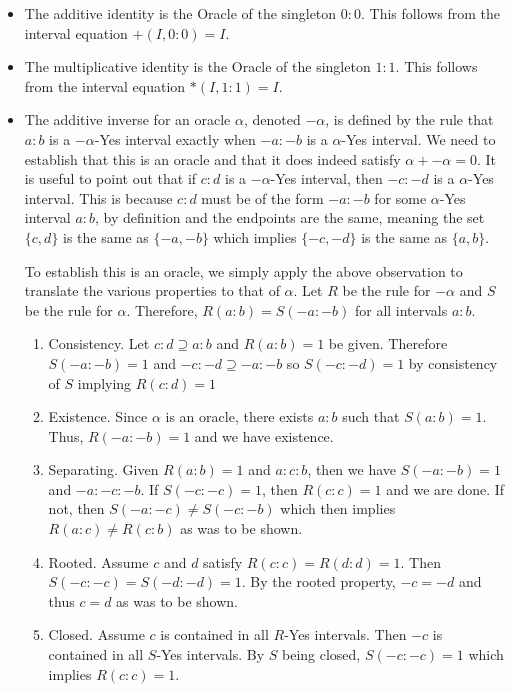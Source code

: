 \documentclass[12pt]{article}
\theoremstyle{remark}
\begin{document}
\begin{itemize}
    \item The additive identity is the Oracle of the singleton $0:0$. This follows from the interval equation $+(I, 0:0) = I$.
    \item The multiplicative identity is the Oracle of the singleton $1:1$. This follows from the interval equation $*(I, 1:1) = I$.
    \item The additive inverse for an oracle $\alpha$, denoted $-\alpha$, is defined by the rule that $a:b$ is a $-\alpha$-Yes interval exactly when $-a:-b$ is a $\alpha$-Yes interval. We need to establish that this is an oracle and that it does indeed satisfy $\alpha + -\alpha = 0$. 
    It is useful to point out that if $c:d$ is a $-\alpha$-Yes interval, then $-c:-d$ is a $\alpha$-Yes interval. This is because $c:d$ must be of the form $-a:-b$ for some $\alpha$-Yes interval $a:b$, by definition and the endpoints are the same, meaning the set $\{c,d\}$ is the same as $\{-a, -b\}$ which implies $\{-c, -d\}$ is the same as $\{a, b\}$.
    
    To establish this is an oracle, we simply apply the above observation to translate the various properties to that of $\alpha$. Let $R$ be the rule for $-\alpha$ and $S$ be the rule for $\alpha$. Therefore, $R(a:b)=S(-a:-b)$ for all intervals $a:b$.
    
    \begin{enumerate}
        \item Consistency. Let $c:d \supseteq a:b$ and $R(a:b)=1$ be given. Therefore $S(-a:-b) = 1$ and $-c:-d \supseteq -a:-b$ so $S(-c:-d)=1$ by consistency of $S$ implying $R(c:d) = 1$
        \item Existence. Since $\alpha$ is an oracle, there exists $a:b$ such that $S(a:b)=1$. Thus, $R(-a:-b)=1$ and we have existence. 
        \item Separating. Given $R(a:b)=1$ and $a:c:b$, then we have $S(-a:-b)=1$ and $-a:-c:-b$. If $S(-c:-c)=1$, then $R(c:c)=1$ and we are done. If not, then $S(-a:-c) \neq S(-c:-b)$ which then implies $R(a:c)\neq R(c:b)$ as was to be shown. 
        \item Rooted. Assume $c$ and $d$ satisfy $R(c:c)=R(d:d)=1$. Then $S(-c:-c)=S(-d:-d)=1$. By the rooted property, $-c = -d$ and thus $c=d$ as was to be shown. 
        \item Closed. Assume $c$ is contained in all $R$-Yes intervals. Then $-c$ is contained in all $S$-Yes intervals. By $S$ being closed, $S(-c:-c)=1$ which implies $R(c:c)=1$.
    \end{enumerate}
    

\end{itemize}
\end{document}
